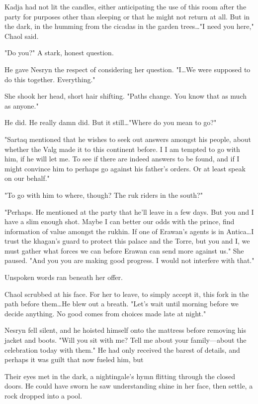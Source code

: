 Kadja had not lit the candles, either anticipating the use of this room after the party for purposes other than sleeping or that he might not return at all.
But in the dark, in the humming from the cicadas in the garden trees\ldots "I need you here," Chaol said.

"Do you?"
A stark, honest question.

He gave Nesryn the respect of considering her question.
"I\ldots We were supposed to do this together.
Everything."

She shook her head, short hair shifting.
"Paths change.
You know that as much as anyone."

He did.
He really damn did.
But it still\ldots "Where do you mean to go?"

"Sartaq mentioned that he wishes to seek out answers amongst his people, about whether the Valg made it to this continent before.
I  I am tempted to go with him, if he will let me.
To see if there are indeed answers to be found, and if I might convince him to perhaps go against his father's orders.
Or at least speak on our behalf."

"To go with him to where, though?
The ruk riders in the south?"

"Perhaps.
He mentioned at the party that he'll leave in a few days.
But you and I have a slim enough shot.
Maybe I can better our odds with the prince, find information of value amongst the rukhin.
If one of Erawan's agents is in Antica\ldots I trust the khagan's guard to protect this palace and the Torre, but you and I, we must gather what forces we can before Erawan can send more against us."
She paused.
"And you 
you are making good progress.
I would not interfere with that."

Unspoken words ran beneath her offer.

Chaol scrubbed at his face.
For her to leave, to simply accept it, this fork in the path before them\ldots He blew out a breath.
"Let's wait until morning before we decide anything.
No good comes from choices made late at night."

Nesryn fell silent, and he hoisted himself onto the mattress before removing his jacket and boots.
"Will you sit with me?
Tell me about your family---about the celebration today with them."
He had only received the barest of details, and perhaps it was guilt that now fueled him, but 

Their eyes met in the dark, a nightingale's hymn flitting through the closed doors.
He could have sworn he saw understanding shine in her face, then settle, a rock dropped into a pool.

